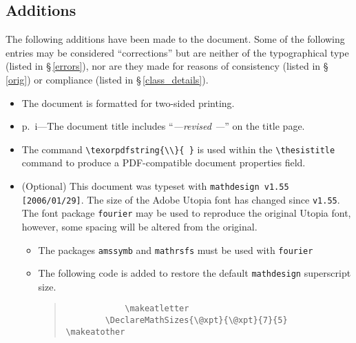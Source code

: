 \begin{spacing}{1.55}
\section{Additions}
The following additions have been made to the document.  Some of the following entries may be considered ``corrections'' but are neither of the typographical type (listed in \S\,\ref{errors}), nor are they made for reasons of consistency (listed in \S\,\ref{orig}) or compliance (listed in \S\,\ref{class_details}).
\label{adds}
\begin{itemize}
  \setlength{\itemsep}{-2pt}	
  \makeatletter
  \if@twoside
  \item The document is formatted for two-sided printing.
  \fi
  \makeatother
  \item p.~i---The document title includes ``\textit{---revised%
	 ---}'' on the title page.
	\item The command \verb|\texorpdfstring{\\}{ }| is used within the \verb|\thesistitle| command to produce a PDF-compatible document properties field.
  \item (Optional) This document was typeset with \texttt{mathdesign v1.55 [2006/01/29]}.  The size of the Adobe Utopia font has changed since \texttt{v1.55}.  The font package \texttt{fourier} may be used to reproduce the original Utopia font, however, some spacing will be altered from the original.
	\vspace{-4pt}	
		\begin{itemize}
			\item The packages \texttt{amssymb} and \texttt{mathrsfs} must be used with \texttt{fourier}
			\item The following code is added to restore the default \texttt{mathdesign} superscript size.
			\begin{quote}
			\begin{singlespace}
			\begin{verbatim}
			\makeatletter
		\DeclareMathSizes{\@xpt}{\@xpt}{7}{5}
\makeatother
			\end{verbatim}
			\end{singlespace}
			\end{quote}
			

\end{itemize}
\end{itemize}
\end{spacing}
